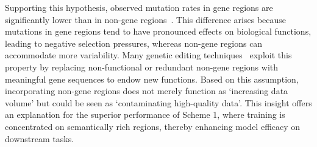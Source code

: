 Supporting this hypothesis, observed mutation rates in gene regions are significantly lower than in non-gene regions~\cite{mutation-rates}. This difference arises because mutations in gene regions tend to have pronounced effects on biological functions, leading to negative selection pressures, whereas non-gene regions can accommodate more variability. Many genetic editing techniques~\cite{CRISPR} exploit this property by replacing non-functional or redundant non-gene regions with meaningful gene sequences to endow new functions. Based on this assumption, incorporating non-gene regions does not merely function as `increasing data volume' but could be seen as `contaminating high-quality data'. This insight offers an explanation for the superior performance of Scheme 1, where training is concentrated on semantically rich regions, thereby enhancing model efficacy on downstream tasks.

